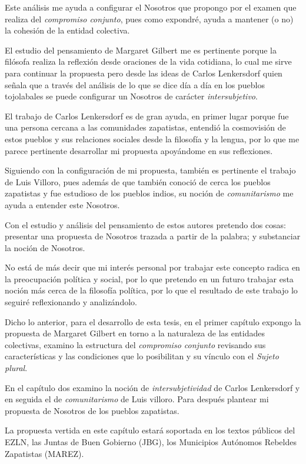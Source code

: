 \documentclass[oneside]{book}
\begin{document}
Este análisis me ayuda a configurar el Nosotros que propongo por el examen que realiza del \textit{compromiso conjunto}, pues como expondré, ayuda a mantener (o no) la cohesión de la entidad colectiva.

El estudio del pensamiento de Margaret Gilbert me es pertinente porque la filósofa realiza la reflexión desde oraciones de la vida cotidiana, lo cual me sirve para continuar la propuesta pero desde las ideas de Carlos Lenkersdorf quien señala que a través del análisis de lo que se dice día a día en los pueblos tojolabales se puede configurar un Nosotros de carácter  \textit{intersubjetivo}.

El trabajo de Carlos Lenkersdorf es de gran ayuda, en primer lugar porque fue una persona cercana a las comunidades zapatistas, entendió la cosmovisión de estos pueblos y sus relaciones sociales desde la filosofía y la lengua, por lo que me parece pertinente desarrollar mi propuesta apoyándome en sus reflexiones. 

Siguiendo con la configuración de mi propuesta, también es pertinente el trabajo de Luis Villoro, pues además de que también conoció de cerca los pueblos zapatistas y fue estudioso de los pueblos indios, su noción de \textit{comunitarismo} me ayuda a entender este Nosotros.

Con el estudio y análisis del pensamiento de estos autores pretendo dos cosas: presentar una propuesta de Nosotros trazada a partir de la palabra; y substanciar la noción de Nosotros.

No está de más decir que mi interés personal por trabajar este concepto radica en la preocupación política y social, por lo que pretendo en un futuro trabajar esta noción más cerca de la filosofía política, por lo que el resultado de este trabajo lo seguiré reflexionando y analizándolo.

Dicho lo anterior, para el desarrollo de esta tesis, en el primer capítulo expongo la propuesta de Margaret Gilbert en torno a la naturaleza de las entidades colectivas, examino la estructura del \textit{compromiso conjunto} revisando sus características y las condiciones que lo posibilitan y su vínculo con el \textit{Sujeto plural}.

En el capítulo dos examino la noción de \textit{intersubjetividad} de Carlos Lenkersdorf y en seguida el de \textit{comunitarismo} de Luis villoro. Para después plantear mi propuesta de Nosotros de los pueblos zapatistas.

La propuesta vertida en este capítulo estará soportada en los textos públicos del EZLN, las Juntas de Buen Gobierno (JBG), los Municipios Autónomos Rebeldes Zapatistas (MAREZ). 
	
\end{document}

